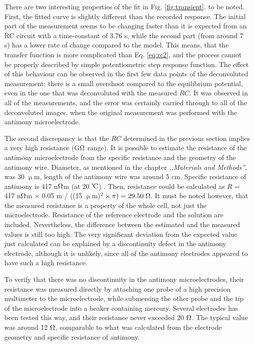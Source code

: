 There are two interesting properties of the fit in Fig. \ref{fig:transient}. to be noted.
First, the fitted curve is slightly different than the recorded response.
The initial part of the measurement seems to be changing faster than it is expected from an RC circuit with a time-constant of 3.76 s, while the second part (from around 7 s) has a lower rate of change compared to the model.
This means, that the transfer function is more complicated than Eq. \ref{eq:rc2}, and the process cannot be properly described by simple potentiometric step response function.
The effect of this behaviour can be observed in the first few data points of the deconvoluted measurement: there is a small overshoot compared to the equilibrium potential, even in the one that was deconvoluted with the measured $RC$.
It was observed in all of the measurements, and the error was certainly carried through to all of the deconvoluted images, when the original measurement was performed with the antimony microelectrode. 

The second discrepancy is that the $RC$ determined in the previous section implies a very high resistance (G$\ohm$ range).
It is possible to estimate the resistance of the antimony microelectrode from the specific resistance and the geometry of the antimony wire.
Diameter, as mentioned in the chapter \emph{,,Materials and Methods''}, was 30 $\upmu$m, length of the antimony wire was around 5 cm.
Specific resistance of antimony is 417 n$\ohm$m (at 20 $\celsius$) \cite{lide2001crc}.
Then, resistance could be calculated as $R$ = 417 n$\ohm$m $\times$ 0.05 m / ((15 $\upmu$m)$^2 \times \pi) = 29.50\; \ohm$.
It must be noted however, that the measured resistance is a property of the whole cell, not just the microelectrode.
Resistance of the reference electrode and the solution are included.
Nevertheless, the difference between the estimated and the measured values is still too high.
The very significant deviation from the expected value just calculated can be explained by a discontinuity defect in the antimony electrode, although it is unlikely, since all of the antimony electrodes appeared to have such a high resistance.

To verify that there was no discontinuity in the antimony microelectrodes, their resistance was measured directly by attaching one probe of a high precision multimeter to the microelectrode, while submersing the other probe and the tip of the microelectrode into a beaker containing mercury.
Several electrodes has been tested this way, and their resistance never exceeded 20 $\ohm$.
The typical value was around 12 $\ohm$, comparable to what was calculated from the electrode geometry and specific resistance of antimony.

